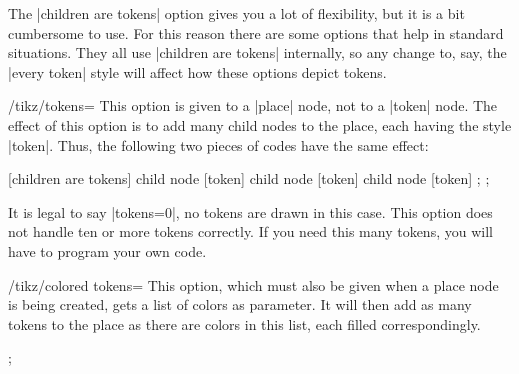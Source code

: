 The |children are tokens| option gives you a lot of flexibility, but it is a
bit cumbersome to use. For this reason there are some options that help in
standard situations. They all use |children are tokens| internally, so any
change to, say, the |every token| style will affect how these options depict
tokens.

\begin{key}{/tikz/tokens=}
    This option is given to a |place| node, not to a |token| node. The effect
    of this option is to add  many child nodes to the place, each
    having the style |token|. Thus, the following two pieces of codes have the
    same effect:
\begin{codeexample}[]
\tikz
  \node[place] {}
  [children are tokens]
  child {node [token] {}}
  child {node [token] {}}
  child {node [token] {}};
\tikz
  \node[place,tokens=3] {};
\end{codeexample}
    It is legal to say |tokens=0|, no tokens are drawn in this case. This
    option does not handle ten or more tokens correctly. If you need this many
    tokens, you will have to program your own code.
\begin{codeexample}[]
\end{codeexample}
\end{key}

\begin{key}{/tikz/colored tokens=}
    This option, which must also be given when a place node is being created,
    gets a list of colors as parameter. It will then add as many tokens to the
    place as there are colors in this list, each filled correspondingly.
\begin{codeexample}[]
\tikz  \node[place,colored tokens={black,black,red,blue}] {};
\end{codeexample}
\end{key}

